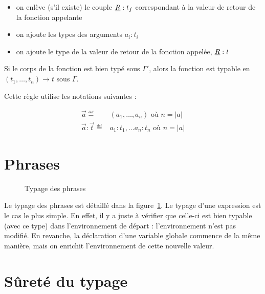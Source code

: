 \begin{itemize}
\item
  on enlève (s'il existe) le couple $\vRet : t_f$ correspondant à la
  valeur de retour de la fonction appelante
\item
  on ajoute les types des arguments $a_i : t_i$
\item
  on ajoute le type de la valeur de retour de la fonction appelée,
  $\vRet : t$
\end{itemize}

Si le corps de la fonction est bien typé sous $Γ'$, alors la fonction est
typable en $(t_1, …, t_n) → t$ sous $Γ$.

\begin{mathpar}
\end{mathpar}

Cette règle utilise les notations suivantes :

\begin{align*}
\vec{a}
\eqdef &
(a_1, …, a_n) \textrm{ où } n = |a|
\\
\vec{a} : \vec{t}
\eqdef &
a_1: t_1,…
a_n: t_n \textrm{ où } n = |a|
\end{align*}


\section{Phrases}

\begin{figure}


  \begin{mathpar}

  \end{mathpar}

  \caption{Typage des phrases}
  \label{fig:typ-ph}

\end{figure}

Le typage des phrases est détaillé dans la figure~\ref{fig:typ-ph}. Le typage
d'une expression est le cas le plus simple. En effet, il y a juste à vérifier
que celle-ci est bien typable (avec ce type) dans l'environnement de départ :
l'environnement n'est pas modifié. En revanche, la déclaration d'une variable
globale commence de la même manière, mais on enrichit l'environnement de cette
nouvelle valeur.

\section{Sûreté du typage}

